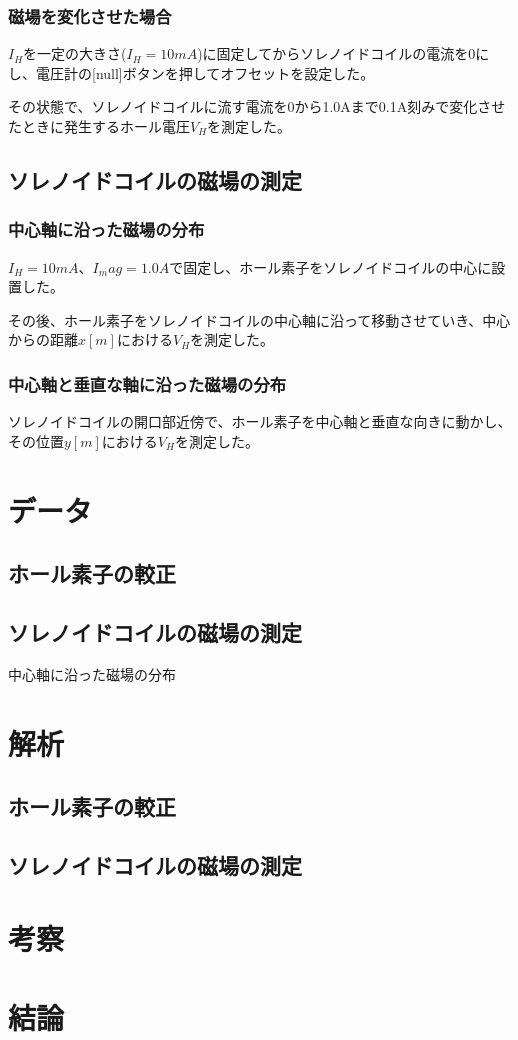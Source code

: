 \documentclass[uplatex,11pt]{jsarticle}
\newcommand{\tab}[4]{ %
    \begin{table}[htb]
        \centering
        
        \caption{#3}
        \label{#1}
    \end{table}
}
\begin{document}
\subsubsection{磁場を変化させた場合}

$I_H$を一定の大きさ($I_H = 10mA$)に固定してからソレノイドコイルの電流を0にし、電圧計の[null]ボタンを押してオフセットを設定した。

その状態で、ソレノイドコイルに流す電流を0から1.0Aまで0.1A刻みで変化させたときに発生するホール電圧$V_H$を測定した。

\subsection{ソレノイドコイルの磁場の測定}

\subsubsection{中心軸に沿った磁場の分布}

$I_H = 10mA$、$I_mag = 1.0A$で固定し、ホール素子をソレノイドコイルの中心に設置した。

その後、ホール素子をソレノイドコイルの中心軸に沿って移動させていき、中心からの距離$x[m]$における$V_H$を測定した。

\subsubsection{中心軸と垂直な軸に沿った磁場の分布}

ソレノイドコイルの開口部近傍で、ホール素子を中心軸と垂直な向きに動かし、その位置$y[m]$における$V_H$を測定した。

\section{データ}
\subsection{ホール素子の較正}

\subsection{ソレノイドコイルの磁場の測定}

\tab{b_1}{./csv/jikken_b_1.csv}{中心軸に沿った磁場の分布}{5}

\section{解析}
\subsection{ホール素子の較正}

\subsection{ソレノイドコイルの磁場の測定}

\section{考察}
\section{結論}
\end{document}
